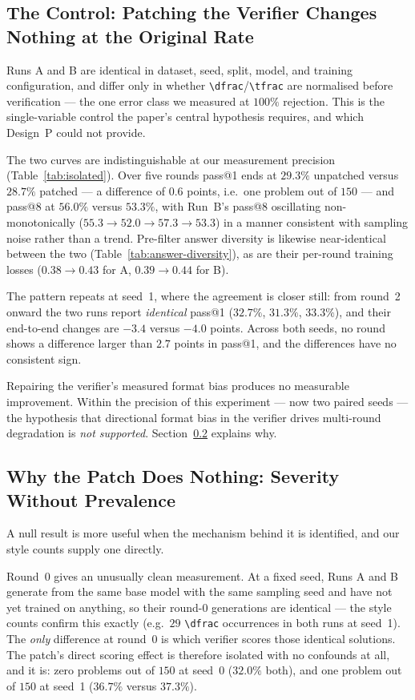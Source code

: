\documentclass[runningheads]{llncs}
\begin{document}
\subsection{The Control: Patching the Verifier Changes Nothing at the Original Rate}
\label{sec:control}

Runs A and B are identical in dataset, seed, split, model, and training
configuration, and differ only in whether \verb|\dfrac|/\verb|\tfrac| are
normalised before verification --- the one error class we measured at
$100\%$ rejection. This is the single-variable control the paper's central
hypothesis requires, and which Design~P could not provide.

The two curves are indistinguishable at our measurement precision
(Table~\ref{tab:isolated}). Over five rounds pass@1 ends at $29.3\%$
unpatched versus $28.7\%$ patched --- a difference of $0.6$ points, i.e.\
one problem out of $150$ --- and pass@8 at $56.0\%$ versus $53.3\%$, with
Run~B's pass@8 oscillating non-monotonically ($55.3\to52.0\to57.3\to53.3$)
in a manner consistent with sampling noise rather than a trend. Pre-filter
answer diversity is likewise near-identical between the two
(Table~\ref{tab:answer-diversity}), as are their per-round training losses
($0.38\to0.43$ for A, $0.39\to0.44$ for B).

The pattern repeats at seed~1, where the agreement is closer still: from
round~2 onward the two runs report \emph{identical} pass@1
($32.7\%$, $31.3\%$, $33.3\%$), and their end-to-end changes are $-3.4$
versus $-4.0$ points. Across both seeds, no round shows a difference larger
than $2.7$ points in pass@1, and the differences have no consistent sign.

Repairing the verifier's measured format bias produces no measurable
improvement. Within the precision of this experiment --- now two paired
seeds --- the hypothesis that directional format bias in the verifier
drives multi-round degradation is \emph{not supported}.
Section~\ref{sec:prevalence} explains why.

\subsection{Why the Patch Does Nothing: Severity Without Prevalence}
\label{sec:prevalence}

A null result is more useful when the mechanism behind it is identified,
and our style counts supply one directly.

Round~0 gives an unusually clean measurement. At a fixed seed, Runs A and B
generate from the same base model with the same sampling seed and have not
yet trained on anything, so their round-0 generations are identical --- the
style counts confirm this exactly (e.g.\ $29$ \verb|\dfrac| occurrences in
both runs at seed~1). The \emph{only} difference at round~0 is which
verifier scores those identical solutions. The patch's direct scoring
effect is therefore isolated with no confounds at all, and it is: zero
problems out of $150$ at seed~0 ($32.0\%$ both), and one problem out of
$150$ at seed~1 ($36.7\%$ versus $37.3\%$).
\end{document}
